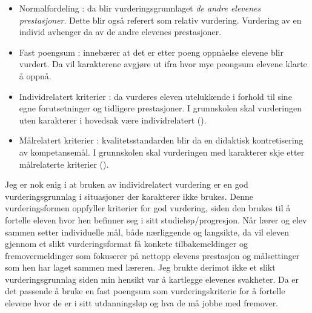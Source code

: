 \documentclass[main.tex]{subfiles}
\begin{document}
\begin{itemize}
\item Normalfordeling : da blir vurderingsgrunnlaget \emph{de andre elevenes prestasjoner}. 
Dette blir også referert som relativ vurdering. Vurdering av en individ avhenger da av de andre
elevenes prestasjoner.
\item Fast poengsum : innebærer at det er etter poeng oppnåelse elevene blir vurdert. Da vil
karakterene avgjøre ut ifra hvor mye peongsum elevene klarte å oppnå.
\item Individrelatert kriterier : da vurderes eleven utelukkende i forhold til sine egne forutsetninger
og tidligere prestasjoner. I grunnskolen skal vurderingen uten karakterer i hovedsak være 
individrelatert  ().
\item Målrelatert kriterier : kvalitetsstandarden blir da en didaktisk kontretisering av kompetansemål.
 I grunnskolen skal vurderingen med karakterer skje etter målrelaterte kriterier ().
\end{itemize}
Jeg er nok enig i at bruken av individrelatert vurdering er en god vurderingsgrunnlag i situasjoner
der karakterer ikke brukes. Denne vurderingsformen oppfyller kriterier for god vurdering,
siden den brukes til å fortelle eleven hvor hen befinner seg i sitt studieløp/progresjon.
Når lærer og elev sammen setter individuelle mål, både nærliggende og langsikte, da vil eleven
gjennom et slikt vurderingsformat få konkete tilbakemeldinger og fremovermeldinger som 
fokuserer på nettopp elevens prestasjon og målsettinger som hen har laget sammen med
læreren.
\newline
\newline
Jeg brukte derimot ikke et slikt vurderingsgrunnlag siden min hensikt var å kartlegge elevenes
svakheter. Da er det passende å bruke en fast poengsum som vurderingskriterie for å 
fortelle elevene hvor de er i sitt utdanningsløp og hva de må jobbe med fremover. 
\end{document}
